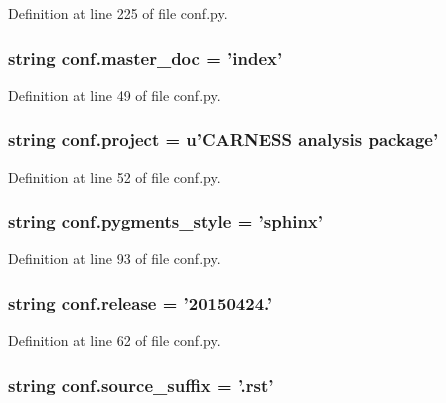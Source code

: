 Definition at line 225 of file conf.\-py.

\hypertarget{a00101_a6fcd7e5236f355b1e1a55f9d95988810}{
\subsubsection[{master\-\_\-doc}]{\setlength{\rightskip}{0pt plus 5cm}string conf.\-master\-\_\-doc = '{\bf index}'}}\label{a00101_a6fcd7e5236f355b1e1a55f9d95988810}


Definition at line 49 of file conf.\-py.

\hypertarget{a00101_a45653c983098153b78e33600e39230eb}{
\subsubsection[{project}]{\setlength{\rightskip}{0pt plus 5cm}string conf.\-project = u'C\-A\-R\-N\-E\-S\-S {\bf analysis} package'}}\label{a00101_a45653c983098153b78e33600e39230eb}


Definition at line 52 of file conf.\-py.

\hypertarget{a00101_a641130e096b26cba8a5d63ed38684de7}{
\subsubsection[{pygments\-\_\-style}]{\setlength{\rightskip}{0pt plus 5cm}string conf.\-pygments\-\_\-style = 'sphinx'}}\label{a00101_a641130e096b26cba8a5d63ed38684de7}


Definition at line 93 of file conf.\-py.

\hypertarget{a00101_a325dc746d8bf05c54d26351c35a21d90}{
\subsubsection[{release}]{\setlength{\rightskip}{0pt plus 5cm}string conf.\-release = '20150424.'}}\label{a00101_a325dc746d8bf05c54d26351c35a21d90}


Definition at line 62 of file conf.\-py.

\hypertarget{a00101_a10af2a769eb3bd3322e874f677e435b1}{
\subsubsection[{source\-\_\-suffix}]{\setlength{\rightskip}{0pt plus 5cm}string conf.\-source\-\_\-suffix = '.rst'}}\label{a00101_a10af2a769eb3bd3322e874f677e435b1}


